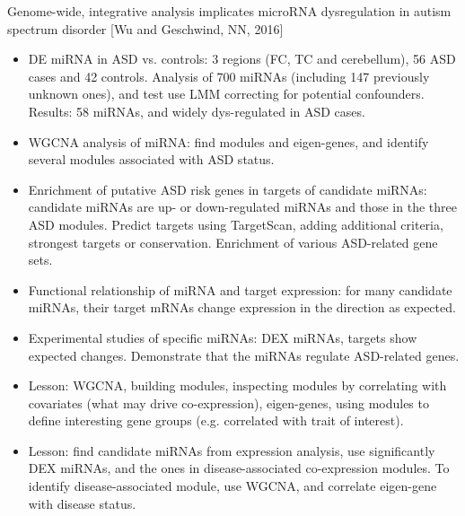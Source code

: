 \documentclass{report}
\begin{document}
Genome-wide, integrative analysis implicates microRNA dysregulation in autism spectrum disorder [Wu and Geschwind, NN, 2016]
\begin{itemize}
	\item DE miRNA in ASD vs. controls: 3 regions (FC, TC and cerebellum), 56 ASD cases and 42 controls. Analysis of 700 miRNAs (including 147 previously unknown ones), and test use LMM correcting for potential confounders. Results: 58 miRNAs, and widely dys-regulated in ASD cases.
	
	\item WGCNA analysis of miRNA: find modules and eigen-genes, and identify several modules associated with ASD status.
	
	\item Enrichment of putative ASD risk genes in targets of candidate miRNAs: candidate miRNAs are up- or down-regulated miRNAs and those in the three ASD modules. Predict targets using TargetScan, adding additional criteria, strongest targets or conservation. Enrichment of various ASD-related gene sets.
	
	\item Functional relationship of miRNA and target expression: for many candidate miRNAs, their target mRNAs change expression in the direction as expected.
	
	\item Experimental studies of specific miRNAs: DEX miRNAs, targets show expected changes. Demonstrate that the miRNAs regulate ASD-related genes.
	
	\item Lesson: WGCNA, building modules, inspecting modules by correlating with covariates (what may drive co-expression), eigen-genes, using modules to define interesting gene groups (e.g. correlated with trait of interest).
	
	\item Lesson: find candidate miRNAs from expression analysis, use significantly DEX miRNAs, and the ones in disease-associated co-expression modules. To identify disease-associated module, use WGCNA, and correlate eigen-gene with disease status.
\end{itemize}
\end{document}
